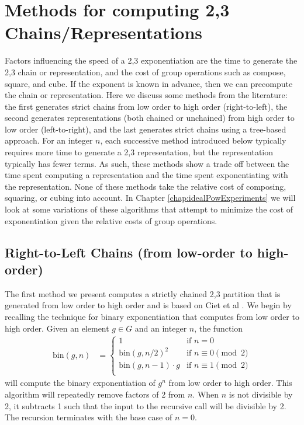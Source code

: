 \documentclass{ucalgthes1}
\theoremstyle{definition}
\begin{document}
\bigbreak
\section{Methods for computing 2,3 Chains/Representations}
\label{sec:dbnsMethods}

Factors influencing the speed of a 2,3 exponentiation are the time to generate the 2,3 chain or representation, and the cost of group operations such as compose, square, and cube. If the exponent is known in advance, then we can precompute the chain or representation. Here we discuss some methods from the literature: the first generates strict chains from low order to high order (right-to-left), the second generates representations (both chained or unchained) from high order to low order (left-to-right), and the last generates strict chains using a tree-based approach.  For an integer $n$, each successive method introduced below typically requires more time to generate a 2,3 representation, but the representation typically has fewer terms.  As such, these methods show a trade off between the time spent computing a representation and the time spent exponentiating with the representation.  None of these methods take the relative cost of composing, squaring, or cubing into account.  In Chapter \ref{chap:idealPowExperiments} we will look at some variations of these algorithms that attempt to minimize the cost of exponentiation given the relative costs of group operations.

\bigbreak
\subsection{Right-to-Left Chains (from low-order to high-order)}
\label{subsec:rtolChains}

The first method we present computes a strictly chained 2,3 partition that is generated from low order to high order and is based on Ciet et al \cite{Ciet2006}.  We begin by recalling the technique for binary exponentiation that computes from low order to high order.  Given an element $g \in G$ and an integer $n$, the function
\begin{align*}
\textrm{bin}(g, n) &= \begin{cases}
               1 & \textrm{if $n = 0$} \\
               {\textrm{bin}(g, n/2)}^2 & \textrm{if $n \equiv 0 \pmod 2$} \\
               \textrm{bin}(g, n-1) \cdot g & \textrm{if $n \equiv 1 \pmod 2$} \\
	       \end{cases}
\end{align*}
will compute the binary exponentiation of $g^n$ from low order to high order. This algorithm will repeatedly remove factors of 2 from $n$.  When $n$ is not divisible by 2, it subtracts 1 such that the input to the recursive call will be divisible by 2.  The recursion terminates with the base case of $n=0$.
\end{document}
